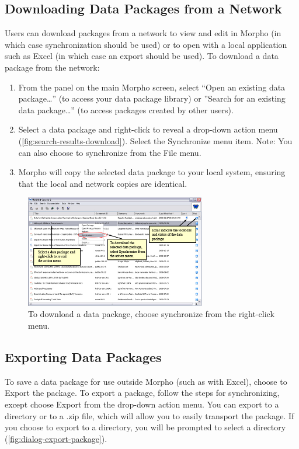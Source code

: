 \subsection{Downloading Data Packages from a Network}

Users can download packages from a network to view and edit in Morpho
(in which case synchronization should be used) or to open with a local
application such as Excel (in which case an export should be used). To
download a data package from the network:
\begin{enumerate}
  \item From the  panel on the main Morpho
    screen, select ``Open an existing data package\ldots'' (to access
    your data package library) or ''Search for an existing data
    package\ldots'' (to access packages created by other users). 
  \item Select a data package and right-click to reveal a drop-down
    action menu (\autoref{fig:search-results-download}). Select the
    Synchronize menu item. Note: You can also choose to synchronize from
    the File menu.
  \item Morpho will copy the selected data package to your local system,
    ensuring that the local and network copies are identical.
\end{enumerate}

\begin{figure}
  \centering
    \includegraphics[width=0.7\textwidth]{images/search-results-download.jpg}
  \caption{To download a data package, choose synchronize from the
    right-click menu.}
  \label{fig:search-results-download}
\end{figure}

\subsection{Exporting Data Packages }

To save a data package for use outside Morpho (such as with Excel),
choose to Export the package. To export a package, follow the steps for
synchronizing, except choose Export from the drop-down action menu. You
can export to a directory or to a .zip file, which will allow you to
easily transport the package. If you choose to export to a directory,
you will be prompted to select a directory
(\autoref{fig:dialog-export-package}).

